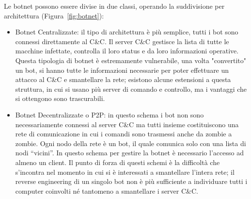 Le botnet possono essere divise in due classi, operando la suddivisione per architettura (Figura~\ref{fig:botnet}):
\begin{itemize}
\item Botnet Centralizzate: il tipo di architettura è più semplice, tutti i bot sono connessi direttamente al C\&C. Il server C\&C gestisce la lista di tutte le macchine infettate, controlla il loro status e da loro informazioni operative. Questa tipologia di botnet è estremamente vulnerabile, una volta "convertito" un bot, si hanno tutte le informazioni necessarie per poter effettuare un attacco al C\&C e smantellare la rete; esistono alcune estensioni a questa struttura, in cui si usano più server di comando e controllo, ma i vantaggi che si ottengono sono trascurabili.
\item Botnet Decentralizzate o P2P: in questo schema i bot non sono necessariamente connessi al server C\&C ma tutti insieme costituiscono una rete di comunicazione in cui i comandi sono trasmessi anche da zombie a zombie. Ogni nodo della rete è un bot, il quale comunica solo con una lista di nodi “vicini”. In questo schema per gestire la botnet è necessario l'accesso ad almeno un client. Il punto di forza di questi schemi è la difficoltà che s'incontra nel momento in cui si è interessati a smantellare l'intera rete; il reverse engineering di un singolo bot non è più sufficiente a individuare tutti i computer coinvolti né tantomeno a smantellare i server C\&C.
\end{itemize}

